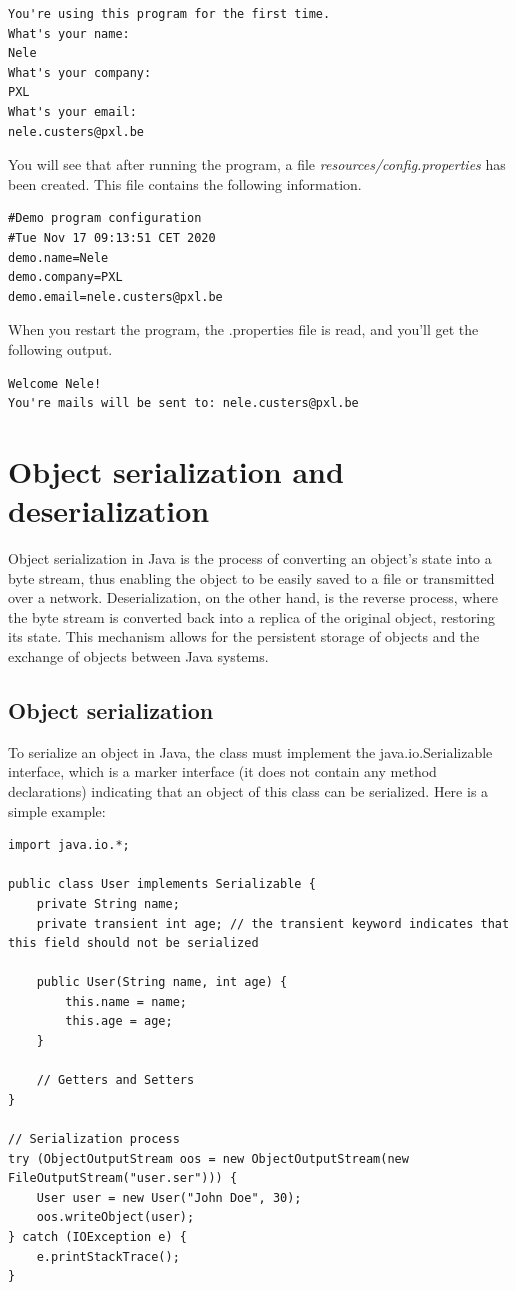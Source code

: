 \begin{verbatim}
You're using this program for the first time.
What's your name:
Nele
What's your company:
PXL
What's your email:
nele.custers@pxl.be
\end{verbatim}

You will see that after running the program, a file \textit{resources/config.properties} has been created. This file contains the following information.

\begin{verbatim}
#Demo program configuration
#Tue Nov 17 09:13:51 CET 2020
demo.name=Nele
demo.company=PXL
demo.email=nele.custers@pxl.be
\end{verbatim}

When you restart the program, the .properties file is read, and you'll get the following output.

\begin{verbatim}
Welcome Nele!
You're mails will be sent to: nele.custers@pxl.be
\end{verbatim}


\section{Object serialization and deserialization}

Object serialization in Java is the process of converting an object's state into a byte stream, thus enabling the object to be easily saved to a file or transmitted over a network. Deserialization, on the other hand, is the reverse process, where the byte stream is converted back into a replica of the original object, restoring its state. This mechanism allows for the persistent storage of objects and the exchange of objects between Java systems.

\subsection{Object serialization}
To serialize an object in Java, the class must implement the java.io.Serializable interface, which is a marker interface (it does not contain any method declarations) indicating that an object of this class can be serialized. Here is a simple example:

\begin{lstlisting}
import java.io.*;

public class User implements Serializable {
    private String name;
    private transient int age; // the transient keyword indicates that this field should not be serialized

    public User(String name, int age) {
        this.name = name;
        this.age = age;
    }
    
    // Getters and Setters
}

// Serialization process
try (ObjectOutputStream oos = new ObjectOutputStream(new FileOutputStream("user.ser"))) {
    User user = new User("John Doe", 30);
    oos.writeObject(user);
} catch (IOException e) {
    e.printStackTrace();
}
\end{lstlisting}

